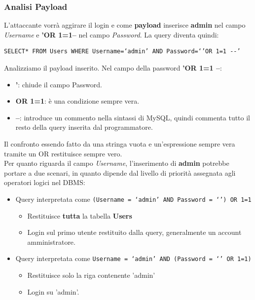 \documentclass{article}
\begin{document}
\subsubsection{Analisi Payload}
L'attaccante vorrà aggirare il login e come \textbf{payload} inserisce \textbf{admin} nel campo \textit{Username} e \textbf{'OR 1=1--} nel campo \textit{Password}. La query diventa quindi:
\begin{verbatim}
SELECT* FROM Users WHERE Username=‘admin’ AND Password=‘’OR 1=1 --’
\end{verbatim}

Analizziamo il payload inserito. Nel campo della password \textbf{'OR 1=1 --}: 
\begin{itemize}
	\item \textbf{'}: chiude il campo Password.
	\item \textbf{OR 1=1}: è una condizione sempre vera.
	\item \textbf{--}: introduce un commento nella sintassi di MySQL, quindi commenta tutto il resto della query inserita dal programmatore. 
\end{itemize}

Il confronto essendo fatto da una stringa vuota e un'espressione sempre vera tramite un OR restituisce sempre vero.\\
Per quanto riguarda il campo \textit{Username}, l'inserimento di \textbf{admin} potrebbe portare a due scenari, in quanto dipende dal livello di priorità assegnata agli operatori logici nel DBMS:
\begin{itemize}
	\item Query interpretata come \verb|(Username = ‘admin’ AND Password = ‘’) OR 1=1|
	\begin{itemize}
		\item Restituisce \textbf{tutta} la tabella \textbf{Users}
		\item Login sul primo utente restituito dalla query, generalmente un account amministratore.
	\end{itemize}
	
	\item Query interpretata come \verb|Username = ‘admin’ AND (Password = ‘’ OR 1=1)|
	\begin{itemize}
		\item Restituisce solo la riga contenente 'admin'
		\item Login su 'admin'.
	\end{itemize}
\end{itemize}
\end{document}
